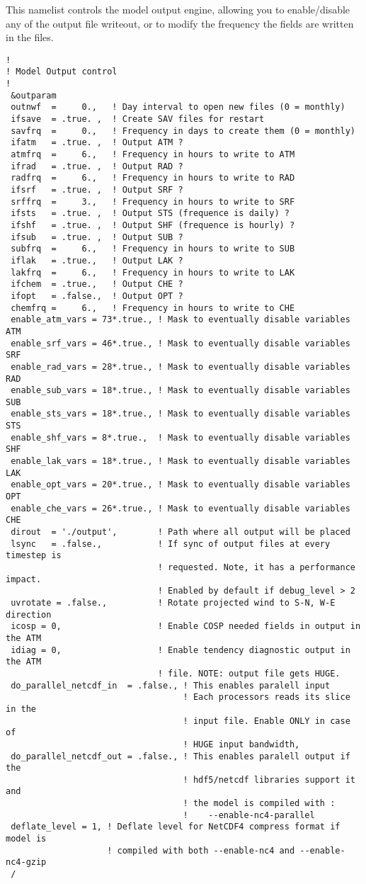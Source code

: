 This namelist controls the model output engine, allowing you to enable/disable
any of the output file writeout, or to modify the frequency the fields are
written in the files.

{\footnotesize
\begin{Verbatim}
!
! Model Output control
!
 &outparam
 outnwf  =     0.,   ! Day interval to open new files (0 = monthly)
 ifsave  = .true. ,  ! Create SAV files for restart
 savfrq  =     0.,   ! Frequency in days to create them (0 = monthly)
 ifatm   = .true. ,  ! Output ATM ?
 atmfrq  =     6.,   ! Frequency in hours to write to ATM
 ifrad   = .true. ,  ! Output RAD ?
 radfrq  =     6.,   ! Frequency in hours to write to RAD
 ifsrf   = .true. ,  ! Output SRF ?
 srffrq  =     3.,   ! Frequency in hours to write to SRF
 ifsts   = .true. ,  ! Output STS (frequence is daily) ?
 ifshf   = .true. ,  ! Output SHF (frequence is hourly) ?
 ifsub   = .true. ,  ! Output SUB ?
 subfrq  =     6.,   ! Frequency in hours to write to SUB
 iflak   = .true.,   ! Output LAK ?
 lakfrq  =     6.,   ! Frequency in hours to write to LAK
 ifchem  = .true.,   ! Output CHE ?
 ifopt   = .false.,  ! Output OPT ?
 chemfrq =     6.,   ! Frequency in hours to write to CHE
 enable_atm_vars = 73*.true., ! Mask to eventually disable variables ATM
 enable_srf_vars = 46*.true., ! Mask to eventually disable variables SRF
 enable_rad_vars = 28*.true., ! Mask to eventually disable variables RAD
 enable_sub_vars = 18*.true., ! Mask to eventually disable variables SUB
 enable_sts_vars = 18*.true., ! Mask to eventually disable variables STS
 enable_shf_vars = 8*.true.,  ! Mask to eventually disable variables SHF
 enable_lak_vars = 18*.true., ! Mask to eventually disable variables LAK
 enable_opt_vars = 20*.true., ! Mask to eventually disable variables OPT
 enable_che_vars = 26*.true., ! Mask to eventually disable variables CHE
 dirout  = './output',        ! Path where all output will be placed
 lsync   = .false.,           ! If sync of output files at every timestep is
                              ! requested. Note, it has a performance impact.
                              ! Enabled by default if debug_level > 2
 uvrotate = .false.,          ! Rotate projected wind to S-N, W-E direction
 icosp = 0,                   ! Enable COSP needed fields in output in the ATM
 idiag = 0,                   ! Enable tendency diagnostic output in the ATM
                              ! file. NOTE: output file gets HUGE.
 do_parallel_netcdf_in  = .false., ! This enables paralell input
                                   ! Each processors reads its slice in the
                                   ! input file. Enable ONLY in case of
                                   ! HUGE input bandwidth,
 do_parallel_netcdf_out = .false., ! This enables paralell output if the 
                                   ! hdf5/netcdf libraries support it and
                                   ! the model is compiled with :
                                   !    --enable-nc4-parallel
 deflate_level = 1, ! Deflate level for NetCDF4 compress format if model is
                    ! compiled with both --enable-nc4 and --enable-nc4-gzip 
 /
\end{Verbatim}
}

